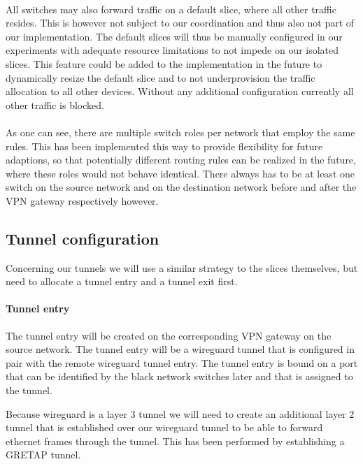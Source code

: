 \paragraph{} All switches may also forward traffic on a default slice, where all other traffic resides. This is however not subject to our coordination and thus also not part of our implementation. The default slices will thus be manually configured in our experiments with adequate resource limitations to not impede on our isolated slices. This feature could be added to the implementation in the future to dynamically resize the default slice and to not underprovision the traffic allocation to all other devices. Without any additional configuration currently all other traffic is blocked.

\paragraph{} As one can see, there are multiple switch roles per network that employ the same rules. This has been implemented this way to provide flexibility for future adaptions, so that potentially different routing rules can be realized in the future, where these roles would not behave identical. There always has to be at least one switch on the source network and on the destination network before and after the VPN gateway respectively however.

\subsection{Tunnel configuration}
\label{impl_tunnel_config}
Concerning our tunnels we will use a similar strategy to the slices themselves, but need to allocate a tunnel entry and a tunnel exit first.

\paragraph{Tunnel entry} The tunnel entry will be created on the corresponding VPN gateway on the source network. The tunnel entry will be a wireguard tunnel that is configured in pair with the remote wireguard tunnel entry. The tunnel entry is bound on a port that can be identified by the black network switches later and that is assigned to the tunnel.

Because wireguard is a layer 3 tunnel we will need to create an additional layer 2 tunnel that is established over our wireguard tunnel to be able to forward ethernet frames through the tunnel. This has been performed by establishing a GRETAP tunnel.

